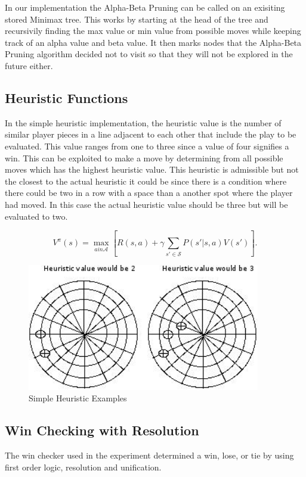 \documentclass[12pt,letterpaper]{article}
\begin{document}
In our implementation the Alpha-Beta Pruning can be called on an exisiting stored Minimax tree. This works by starting at the head of the tree and recursivily finding the max value or min value from possible moves while keeping track of an alpha value and beta value.  It then marks nodes that the Alpha-Beta Pruning algorithm decided not to visit so that they will not be explored in the future either. 


\subsection{Heuristic Functions}

In the simple heuristic implementation, the heuristic value is the number of similar player pieces in a line adjacent to each other that include the play to be evaluated. This value ranges from one to three since a value of four signifies a win. This can be exploited to make a move by determining from all possible moves which has the highest heuristic value. This heuristic is admissible but not the closest to the actual heuristic it could be since there is a condition where there could be two in a row with a space than a another spot where the player had moved. In this case the actual heuristic value should be three but will be evaluated to two.

\[
V^\pi(s)=\max_{a in \mathcal{A}} \left[ R(s,a) + \gamma \sum_{s' \in \mathcal{S}} P(s'|s,a) V(s') \right].
\]

\begin{figure}[h]
\begin{center}
\includegraphics[width=4in]{heu.png}
\end{center}
\caption{Simple Heuristic Examples}
\label{heuristicExample}
\end{figure}

\subsection{Win Checking with Resolution}
The win checker used in the experiment determined a win, lose, or tie by using first order logic, resolution and unification.
\end{document}
